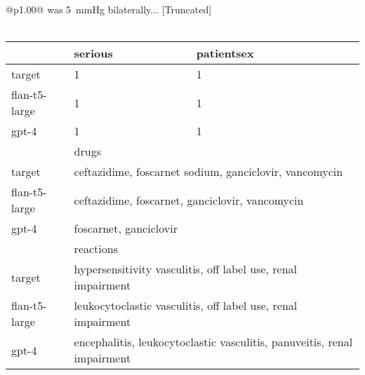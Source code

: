 \begin{longtable}{@{}p{}@{}}
was 5~mmHg bilaterally... [Truncated] \\ \\ \begin{tabular}{lll} \hline & serious & patientsex \\ \hline target & 1 & 1 \\ flan-t5-large & 1 & 1 \\ gpt-4 & 1 & 1 \\ \hline & \multicolumn{2}{l}{drugs} \\ \hline target & \multicolumn{2}{p{13.2cm}}{ceftazidime, foscarnet sodium, ganciclovir, vancomycin} \\ flan-t5-large & \multicolumn{2}{p{13.2cm}}{ceftazidime, foscarnet, ganciclovir, vancomycin} \\ gpt-4 & \multicolumn{2}{p{13.2cm}}{foscarnet, ganciclovir} \\ \hline & \multicolumn{2}{l}{reactions} \\ \hline target & \multicolumn{2}{p{13.2cm}}{hypersensitivity vasculitis, off label use, renal impairment} \\ flan-t5-large & \multicolumn{2}{p{13.2cm}}{leukocytoclastic vasculitis, off label use, renal impairment} \\ gpt-4 & \multicolumn{2}{p{13.2cm}}{encephalitis, leukocytoclastic vasculitis, panuveitis, renal impairment} \\ \hline \end{tabular} \\ \\

\end{longtable}
